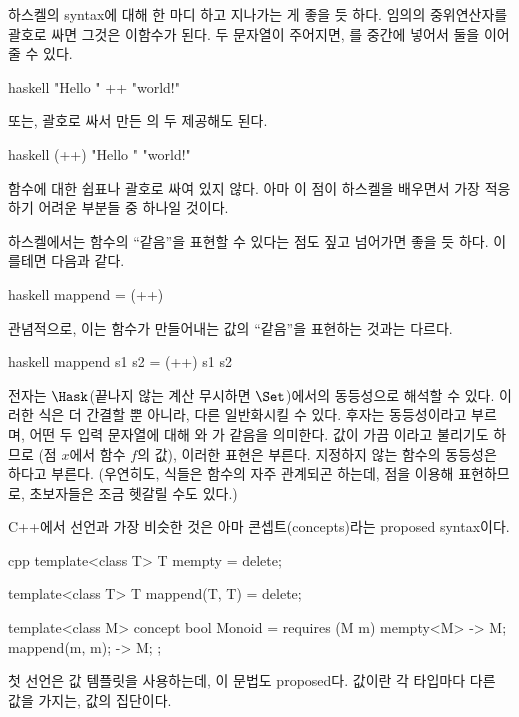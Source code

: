 하스켈의 syntax에 대해 한 마디 하고 지나가는 게 좋을 듯 하다. 임의의 중위연산자를 괄호로 싸면 그것은 이\trArgument 함수가 된다.
두 문자열이 주어지면, \code{++}를 중간에 넣어서 둘을 이어줄 수 있다.

\begin{snip}{haskell}
"Hello " ++ "world!"
\end{snip}
또는, 괄호로 싸서 만든 \code{(++)}의 두 \trArgument\로 제공해도 된다.

\begin{snip}{haskell}
(++) "Hello " "world!"
\end{snip}
함수에 대한 \trArgument\가 쉽표나 괄호로 싸여 있지 않다.
아마 이 점이 하스켈을 배우면서 가장 적응하기 어려운 부분들 중 하나일 것이다.

하스켈에서는 함수의 ``같음''을 표현할 수 있다는 점도 짚고 넘어가면 좋을 듯 하다. 이를테면 다음과 같다.

\begin{snip}{haskell}
mappend = (++)
\end{snip}
관념적으로, 이는 함수가 만들어내는 값의 ``같음''을 표현하는 것과는 다르다.

\begin{snip}{haskell}
mappend s1 s2 = (++) s1 s2
\end{snip}
전자는 \trCategory $\Hask$(끝나지 않는 계산 \trBottom\을 무시하면 $\Set$)에서의  동등성으로 해석할 수 있다.
이러한 식은 더 간결할 뿐 아니라, 다른 \trCategory\로 일반화시킬 수 있다.
후자는 \newterm{\trExtensional} 동등성이라고 부르며,
어떤 두 입력 문자열에 대해 와 \code{(++)}가 같음을 의미한다.
 값이 가끔 이라고 불리기도 하므로 (점 $x$에서 함수 $f$의 값), 이러한 표현은 
\trPointWiseEquality{} 부른다.
\trArgument\를 지정하지 않는 함수의 동등성은 \newterm{\trPointFree}하다고 부른다.
(우연히도, \trPointFree 식들은 함수의 \trComposition\과 자주 관계되곤 하는데, \trComposition\은 점을 이용해 표현하므로, 초보자들은 조금 헷갈릴 수도 있다.)

C++에서 \trMonoid 선언과 가장 비슷한 것은 아마 콘셉트(concepts)라는 proposed syntax이다. 

\begin{snip}{cpp}
template<class T>
  T mempty = delete;
  
template<class T>
  T mappend(T, T) = delete;
  
template<class M> 
  concept bool Monoid = requires (M m) { 
    { mempty<M> } -> M; 
    { mappend(m, m); } -> M;
  };
\end{snip}
첫 선언은 값 템플릿을 사용하는데, 이 문법도 proposed다. 
\trPolymorphic 값이란 각 타입마다 다른 값을 가지는, 값의 집단이다.

